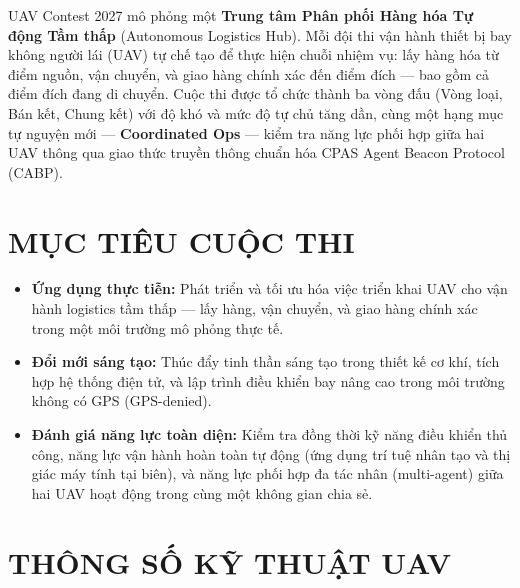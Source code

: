 \documentclass[12pt,a4paper]{article}
\begin{document}
UAV Contest 2027 mô phỏng một \textbf{Trung tâm Phân phối Hàng hóa Tự động Tầm thấp} (Autonomous Logistics Hub). Mỗi đội thi vận hành thiết bị bay không người lái (UAV) tự chế tạo để thực hiện chuỗi nhiệm vụ: lấy hàng hóa từ điểm nguồn, vận chuyển, và giao hàng chính xác đến điểm đích — bao gồm cả điểm đích đang di chuyển. Cuộc thi được tổ chức thành ba vòng đấu (Vòng loại, Bán kết, Chung kết) với độ khó và mức độ tự chủ tăng dần, cùng một hạng mục tự nguyện mới — \textbf{Coordinated Ops} — kiểm tra năng lực phối hợp giữa hai UAV thông qua giao thức truyền thông chuẩn hóa CPAS Agent Beacon Protocol (CABP).

\section{MỤC TIÊU CUỘC THI}

\begin{itemize}
\item \textbf{Ứng dụng thực tiễn:} Phát triển và tối ưu hóa việc triển khai UAV cho vận hành logistics tầm thấp — lấy hàng, vận chuyển, và giao hàng chính xác trong một môi trường mô phỏng thực tế.
\item \textbf{Đổi mới sáng tạo:} Thúc đẩy tinh thần sáng tạo trong thiết kế cơ khí, tích hợp hệ thống điện tử, và lập trình điều khiển bay nâng cao trong môi trường không có GPS (GPS-denied).
\item \textbf{Đánh giá năng lực toàn diện:} Kiểm tra đồng thời kỹ năng điều khiển thủ công, năng lực vận hành hoàn toàn tự động (ứng dụng trí tuệ nhân tạo và thị giác máy tính tại biên), và năng lực phối hợp đa tác nhân (multi-agent) giữa hai UAV hoạt động trong cùng một không gian chia sẻ.
\end{itemize}

\section{THÔNG SỐ KỸ THUẬT UAV}
\end{document}

